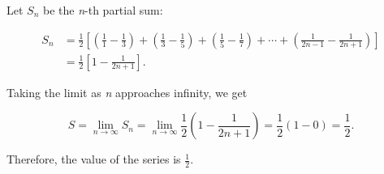 Let \(S_n\) be the \emph{n}-th partial sum:

\begin{align*}
    S_n &= \frac{1}{2} \left[ \left( \frac{1}{1} - \frac{1}{3} \right) + \left( \frac{1}{3} - \frac{1}{5} \right) + \left( \frac{1}{5} - \frac{1}{7} \right) + \cdots + \left( \frac{1}{2n - 1} - \frac{1}{2n + 1} \right) \right] \\
    &= \frac{1}{2} \left[ 1 - \frac{1}{2n + 1} \right].
\end{align*}

Taking the limit as \emph{n} approaches infinity, we get

\[
    S = \lim_{n \to \infty} S_n = \lim_{n \to \infty} \frac{1}{2} \left( 1 - \frac{1}{2n + 1} \right) = \frac{1}{2} (1 - 0) = \frac{1}{2}.
\]

Therefore, the value of the series is \(\frac{1}{2}\).
